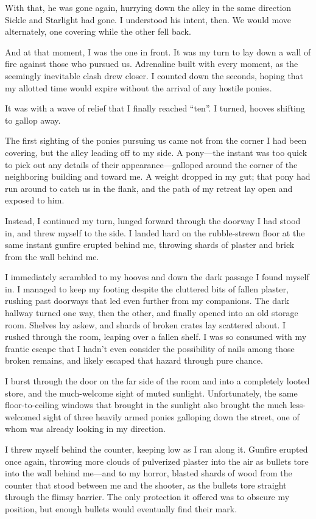 With that, he was gone again, hurrying down the alley in the same direction Sickle and Starlight had gone. I understood his intent, then. We would move alternately, one covering while the other fell back.

And at that moment, I was the one in front. It was my turn to lay down a wall of fire against those who pursued us. Adrenaline built with every moment, as the seemingly inevitable clash drew closer. I counted down the seconds, hoping that my allotted time would expire without the arrival of any hostile ponies.

It was with a wave of relief that I finally reached “ten”. I turned, hooves shifting to gallop away.

The first sighting of the ponies pursuing us came not from the corner I had been covering, but the alley leading off to my side. A pony—the instant was too quick to pick out any details of their appearance—galloped around the corner of the neighboring building and toward me. A weight dropped in my gut; that pony had run around to catch us in the flank, and the path of my retreat lay open and exposed to him.

Instead, I continued my turn, lunged forward through the doorway I had stood in, and threw myself to the side. I landed hard on the rubble-strewn floor at the same instant gunfire erupted behind me, throwing shards of plaster and brick from the wall behind me.

I immediately scrambled to my hooves and down the dark passage I found myself in. I managed to keep my footing despite the cluttered bits of fallen plaster, rushing past doorways that led even further from my companions. The dark hallway turned one way, then the other, and finally opened into an old storage room. Shelves lay askew, and shards of broken crates lay scattered about. I rushed through the room, leaping over a fallen shelf. I was so consumed with my frantic escape that I hadn’t even consider the possibility of nails among those broken remains, and likely escaped that hazard through pure chance.

I burst through the door on the far side of the room and into a completely looted store, and the much-welcome sight of muted sunlight. Unfortunately, the same floor-to-ceiling windows that brought in the sunlight also brought the much less-welcomed sight of three heavily armed ponies galloping down the street, one of whom was already looking in my direction.

I threw myself behind the counter, keeping low as I ran along it. Gunfire erupted once again, throwing more clouds of pulverized plaster into the air as bullets tore into the wall behind me—and to my horror, blasted shards of wood from the counter that stood between me and the shooter, as the bullets tore straight through the flimsy barrier. The only protection it offered was to obscure my position, but enough bullets would eventually find their mark.

